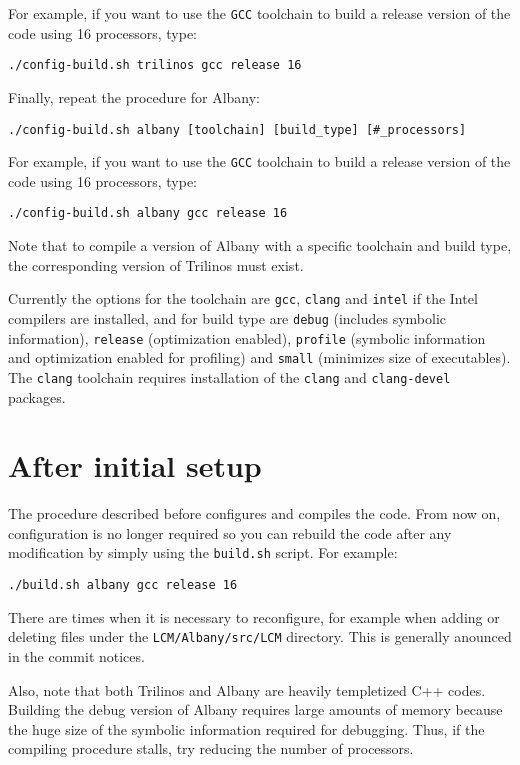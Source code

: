 \documentclass[10pt,a4paper]{article} \usepackage[utf8]{inputenc}
\begin{document}
For example, if you want to use the \verb+GCC+ toolchain to build a
release version of the code using 16 processors, type:
\begin{verbatim}
./config-build.sh trilinos gcc release 16
\end{verbatim}

Finally, repeat the procedure for Albany:
\begin{verbatim}
./config-build.sh albany [toolchain] [build_type] [#_processors]
\end{verbatim}

For example, if you want to use the \verb+GCC+ toolchain to build a
release version of the code using 16 processors, type:
\begin{verbatim}
./config-build.sh albany gcc release 16
\end{verbatim}

Note that to compile a version of Albany with a specific toolchain and
build type, the corresponding version of Trilinos must exist.

Currently the options for the toolchain are \verb+gcc+, \verb+clang+
and \verb+intel+ if the Intel compilers are installed, and for build
type are \verb+debug+ (includes symbolic information), \verb+release+
(optimization enabled), \verb+profile+ (symbolic information and
optimization enabled for profiling) and \verb+small+ (minimizes size
of executables). The \verb+clang+ toolchain requires installation of
the \verb+clang+ and \verb+clang-devel+ packages.

\section{After initial setup}
The procedure described before configures and compiles the code. From
now on, configuration is no longer required so you can rebuild the
code after any modification by simply using the \verb+build.sh+
script. For example:
\begin{verbatim}
./build.sh albany gcc release 16
\end{verbatim}

There are times when it is necessary to reconfigure, for example when
adding or deleting files under the \verb+LCM/Albany/src/LCM+
directory. This is generally anounced in the commit notices.

Also, note that both Trilinos and Albany are heavily templetized C++
codes. Building the debug version of Albany requires large amounts of
memory because the huge size of the symbolic information required for
debugging. Thus, if the compiling procedure stalls, try reducing the
number of processors.
\end{document}
